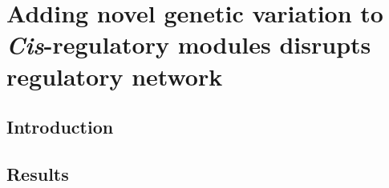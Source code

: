 \documentclass[../main.tex]{subfiles}
\begin{document}
\chapter{Adding novel genetic variation to \textit{Cis}\hyp{}regulatory modules disrupts regulatory network}
\label{chapter7}
\section{Introduction}
\label{chapter7:introduction}

\section{Results}
\label{chapter7:results}
\end{document}
